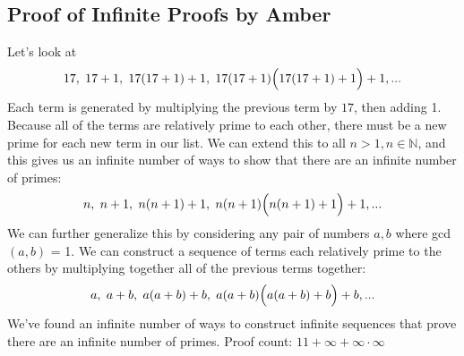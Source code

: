 \documentclass[12pt]{scrartcl}
\begin{document}
\subsection*{Proof of Infinite Proofs by Amber}
Let's look at
\begin{equation*}
	17, \hspace{0.3em} 17+1,  \hspace{0.3em} 17(17+1)+1, \hspace{0.3em}  17(17+1)\Big(17(17+1)+1\Big)+1,...
\end{equation*}
Each term is generated by multiplying the previous term by $17$, then adding 1. Because all of the terms are relatively prime to each other, there must be a new prime for each new term in our list. We can extend this to all $n>1, n \in \mathbb{N}$, and this gives us an infinite number of ways to show that there are an infinite number of primes:
\begin{equation*}
	n, \hspace{0.3em} n+1, \hspace{0.3em} n(n+1)+1, \hspace{0.3em}  n(n+1)\Big(n(n+1)+1\Big)+1,...
\end{equation*}
We can further generalize this by considering any pair of numbers $a,b$ where gcd$(a,b)$ = 1. We can construct a sequence of terms each relatively prime to the others by multiplying together all of the previous terms together:
\begin{equation*}
	a, \hspace{0.3em} a+b, \hspace{0.3em} a(a+b)+b, \hspace{0.3em}  a(a+b)\Big(a(a+b)+b\Big)+b,...
\end{equation*}
We've found an infinite number of ways to construct infinite sequences that prove there are an infinite number of primes. Proof count: $11+\infty+\infty\cdot\infty$



\end{document}
